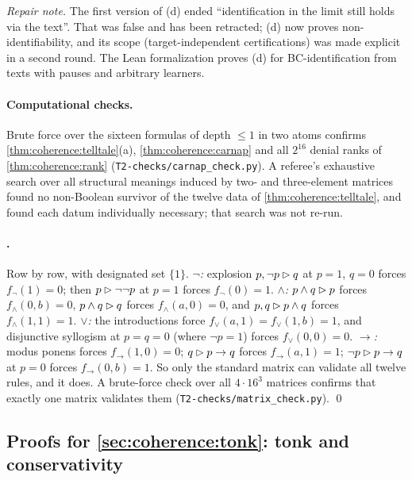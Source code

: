 \emph{Repair note.} The first version of (d) ended ``identification in the limit still holds via the text''. That was false and has been retracted; (d) now proves non-identifiability, and its scope (target-independent certifications) was made explicit in a second round. The Lean formalization proves (d) for BC-identification from texts with pauses and arbitrary learners.

\paragraph{Computational checks.}  Brute force over the sixteen formulas of depth $\le1$ in two atoms confirms \cref{thm:coherence:telltale}(a), \cref{thm:coherence:carnap} and all $2^{16}$ denial ranks of \cref{thm:coherence:rank} (\nolinkurl{T2-checks/carnap_check.py}). A referee's exhaustive search over all structural meanings induced by two- and three-element matrices found no non-Boolean survivor of the twelve data of \cref{thm:coherence:telltale}, and found each datum individually necessary; that search was not re-run.

\paragraph{.} Row by row, with designated set $\{1\}$. \emph{$\neg$:} explosion $p,\neg p\rhd q$ at $p=1$, $q=0$ forces $f_\neg(1)=0$; then $p\rhd\neg\neg p$ at $p=1$ forces $f_\neg(0)=1$. \emph{$\wedge$:} $p\wedge q\rhd p$ forces $f_\wedge(0,b)=0$, $p\wedge q\rhd q$ forces $f_\wedge(a,0)=0$, and $p,q\rhd p\wedge q$ forces $f_\wedge(1,1)=1$. \emph{$\vee$:} the introductions force $f_\vee(a,1)=f_\vee(1,b)=1$, and disjunctive syllogism at $p=q=0$ (where $\neg p=1$) forces $f_\vee(0,0)=0$. \emph{$\to$:} modus ponens forces $f_\to(1,0)=0$; $q\rhd p\to q$ forces $f_\to(a,1)=1$; $\neg p\rhd p\to q$ at $p=0$ forces $f_\to(0,b)=1$. So only the standard matrix can validate all twelve rules, and it does. A brute-force check over all $4\cdot16^3$ matrices confirms that exactly one matrix validates them (\nolinkurl{T2-checks/matrix_check.py}). \qed

\subsection{Proofs for \texorpdfstring{\cref{sec:coherence:tonk}}{Section 6.5}: tonk and conservativity}\label{app:coherence:tonk}

